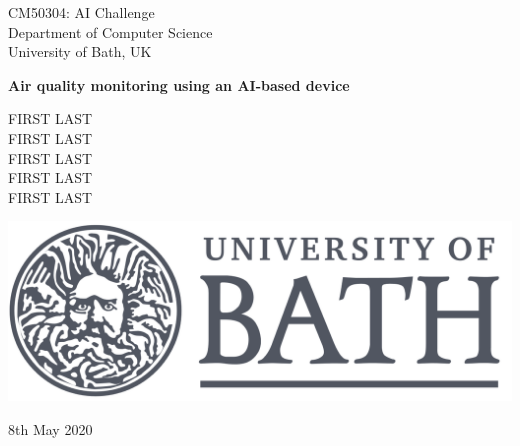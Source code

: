 \documentclass[10pt,english, openany]{book}
\begin{document}

\begin{titlepage}
	\clearpage\thispagestyle{empty}
	\centering
	\vspace{1cm}

	{\normalsize CM50304: AI Challenge \\ 
		Department of Computer Science \\
		University of Bath, UK \par}
		\vspace{3cm}
	{\Huge \textbf{Air quality monitoring using an AI-based device}} \\
	\vspace{4cm}
	{\normalsize FIRST LAST \\ %
	             FIRST LAST \\
	             FIRST LAST \\
	             FIRST LAST \\
	             FIRST LAST \par}
	\vspace{5cm}
    
    \centering \includegraphics[scale=0.1]{University_of_Bath_logo.svg.png}
    
    \vspace{0.5cm}
		
	{\normalsize 8th May 2020 \par}
	
	\pagebreak

\end{titlepage}

\tableofcontents{}

\mainmatter
\end{document}
